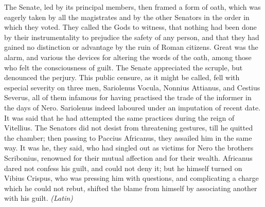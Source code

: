 The Senate, led by its principal members, then framed a form of oath, which was eagerly taken by all the magistrates and by the other Senators in the order in which they voted. They called the Gods to witness, that nothing had been done by their instrumentality to prejudice the safety of any person, and that they had gained no distinction or advantage by the ruin of Roman citizens. Great was the alarm, and various the devices for altering the words of the oath, among those who felt the consciousness of guilt. The Senate appreciated the scruple, but denounced the perjury. This public censure, as it might be called, fell with especial severity on three men, Sariolenus Vocula, Nonnius Attianus, and Cestius Severus, all of them infamous for having practised the trade of the informer in the days of Nero. Sariolenus indeed laboured under an imputation of recent date. It was said that he had attempted the same practices during the reign of Vitellius. The Senators did not desist from threatening gestures, till he quitted the chamber; then passing to Paccius Africanus, they assailed him in the same way. It was he, they said, who had singled out as victims for Nero the brothers Scribonius, renowned for their mutual affection and for their wealth. Africanus dared not confess his guilt, and could not deny it; but he himself turned on Vibius Crispus, who was pressing him with questions, and complicating a charge which he could not rebut, shifted the blame from himself by associating another with his guilt. \emph{(Latin)}


